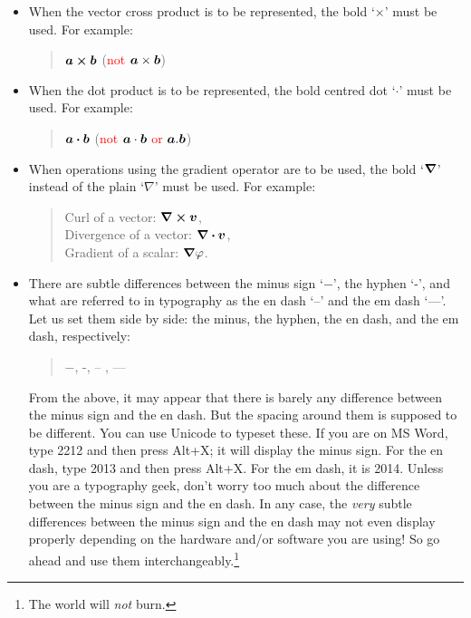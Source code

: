 \begin{itemize}
\item When the vector cross product is to be represented, the bold `$\boldsymbol{\times}$' must be used. For example:
\begin{quote}
$\vectorsym{a} \boldsymbol{\times} \vectorsym{b}$ \quad (\textcolor{red}{not $\vectorsym{a} \times \vectorsym{b}$})
\end{quote}

\clearpage

\item When the dot product is to be represented, the bold centred dot `$\boldsymbol{\cdot}$' must be used. For example:
\begin{quote}
$\vectorsym{a} \boldsymbol{\cdot} \vectorsym{b}$ \quad (\textcolor{red}{not $\vectorsym{a} \cdot \vectorsym{b}$ or $\vectorsym{a} . \vectorsym{b}$})
\end{quote}

\item When operations using the gradient operator are to be used, the bold `$\boldsymbol{\nabla}$' instead of the plain `$\nabla$' must be used. For example:
\begin{quote}
Curl of a vector: $\bs{\nabla} \bs{\times} \vectorsym{v}$, \\
Divergence of a vector: $\bs{\nabla} \bs{\cdot} \vectorsym{v}$, \\
Gradient of a scalar: $\boldsymbol{\nabla} \varphi$.
\end{quote}

\vspace{1cm}


\item There are subtle differences between the minus sign `$-$', the hyphen `-', and what are referred to in typography as the en dash `--' and the em dash `---'. Let us set them side by side: the minus, the hyphen, the en dash, and the em dash, respectively:
\begin{quote}
$-$, -, -- , ---
\end{quote}
From the above, it may appear that there is barely any difference between the minus sign and the en dash. But the spacing around them is supposed to be different. You can use Unicode to typeset these. If you are on MS Word, type 2212 and then press Alt+X; it will display the minus sign. For the en dash, type 2013 and then press Alt+X. For the em dash, it is 2014. Unless you are a typography geek, don't worry too much about the difference between the minus sign and the en dash. In any case, the {\em very} subtle differences between the minus sign and the en dash may not even display properly depending on the hardware and/or software you are using! So go ahead and use them interchangeably.\footnote{The world will {\em not} burn.}



\end{itemize}
